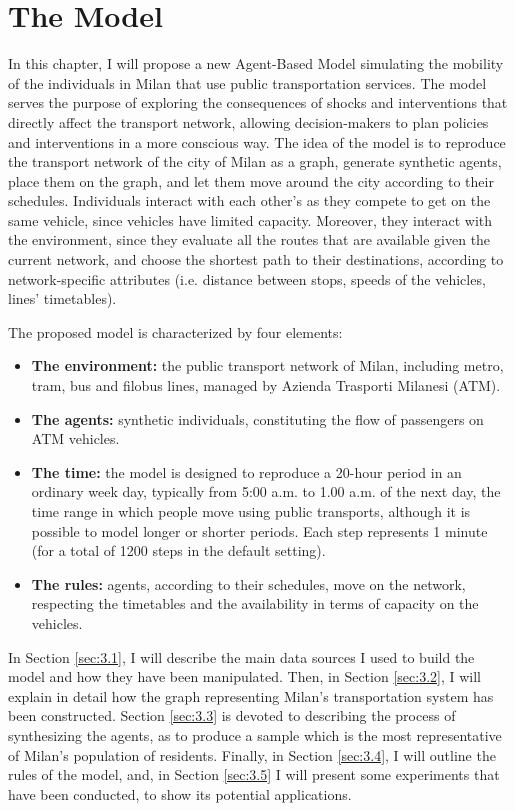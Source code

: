 \chapter{The Model} \label{ch:model}

In this chapter, I will propose a new Agent-Based Model simulating the mobility of the individuals in Milan that use public transportation services. The model serves the purpose of exploring the consequences of shocks and interventions that directly affect the transport network, allowing decision-makers to plan policies and interventions in a more conscious way. The idea of the model is to reproduce the transport network of the city of Milan as a graph, generate synthetic agents, place them on the graph, and let them move around the city according to their schedules. Individuals interact with each other's as they compete to get on the same vehicle, since vehicles have limited capacity. Moreover, they interact with the environment, since they evaluate all the routes that are available given the current network, and choose the shortest path to their destinations, according to network-specific attributes (i.e. distance between stops, speeds of the vehicles, lines' timetables). 

The proposed model is characterized by four elements:
\begin{itemize}
    \item \textbf{The environment:} the public transport network of Milan, including metro, tram, bus and filobus lines, managed by Azienda Trasporti Milanesi (ATM).
    \item \textbf{The agents:} synthetic individuals, constituting the flow of passengers on ATM vehicles.
    \item \textbf{The time:} the model is designed to reproduce a 20-hour period in an ordinary week day, typically from 5:00 a.m. to 1.00 a.m. of the next day, the time range in which people move using public transports, although it is possible to model longer or shorter periods. Each step represents 1 minute (for a total of 1200 steps in the default setting).
    \item \textbf{The rules:} agents, according to their schedules, move on the network, respecting the timetables and the availability in terms of capacity on the vehicles.
\end{itemize}

In Section \ref{sec:3.1}, I will describe the main data sources I used to build the model and how they have been manipulated. Then, in Section \ref{sec:3.2}, I will explain in detail how the graph representing Milan's transportation system has been constructed. Section \ref{sec:3.3} is devoted to describing the process of synthesizing the agents, as to produce a sample which is the most representative of Milan's population of residents. Finally, in Section \ref{sec:3.4}, I will outline the rules of the model, and, in Section \ref{sec:3.5} I will present some experiments that have been conducted, to show its potential applications.

